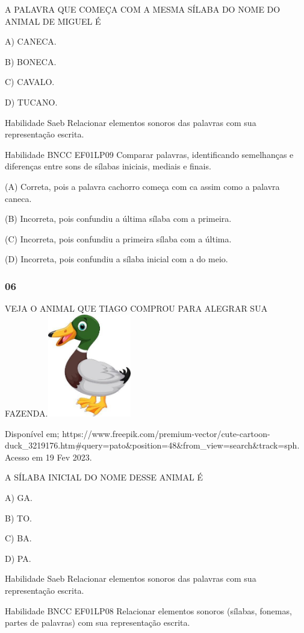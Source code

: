 A PALAVRA QUE COMEÇA COM A MESMA SÍLABA DO NOME DO ANIMAL DE MIGUEL É

A) CANECA.

B) BONECA.

C) CAVALO.

D) TUCANO.

Habilidade Saeb Relacionar elementos sonoros das palavras com sua
representação escrita.

Habilidade BNCC EF01LP09 Comparar palavras, identificando semelhanças e
diferenças entre sons de sílabas iniciais, mediais e finais.

(A) Correta, pois a palavra cachorro começa com ca assim como a palavra
caneca.

(B) Incorreta, pois confundiu a última sílaba com a primeira.

(C) Incorreta, pois confundiu a primeira sílaba com a última.

(D) Incorreta, pois confundiu a sílaba inicial com a do meio.

\subsubsection{06}\label{section-46}

VEJA O ANIMAL QUE TIAGO COMPROU PARA ALEGRAR SUA
FAZENDA.\includegraphics[width=1.43478in,height=1.76408in]{media/image215.jpg}

Disponível em;
https://www.freepik.com/premium-vector/cute-cartoon-duck\_3219176.htm\#query=pato\&position=48\&from\_view=search\&track=sph.
Acesso em 19 Fev 2023.

A SÍLABA INICIAL DO NOME DESSE ANIMAL É

A) GA.

B) TO.

C) BA.

D) PA.

Habilidade Saeb Relacionar elementos sonoros das palavras com sua
representação escrita.

Habilidade BNCC EF01LP08 Relacionar elementos sonoros (sílabas, fonemas,
partes de palavras) com sua representação escrita.

